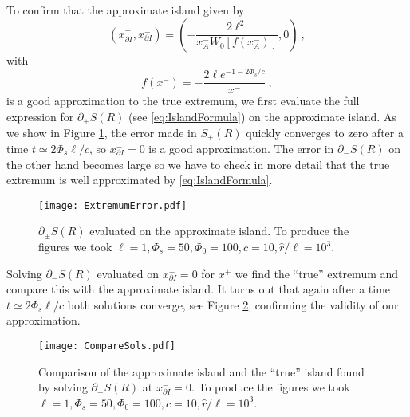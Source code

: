 \documentclass[a4paper,11pt]{article}
\newcommand{\beq}{\begin{equation}}
\newcommand{\eeq}{\end{equation}}
\numberwithin{equation}{section}
\begin{document}
To confirm that the approximate island given by
\beq
(x_{\partial I}^+,x_{\partial I}^-) = \left(-\frac{2\ell^2}{x_A^-W_0\left[f(x_A^-)\right]},0\right) ~,
\eeq
with
\beq
f(x^-)=-\frac{2\ell e^{-1-2\Phi_s/c}}{x^-} ~,
\eeq
is a good approximation to the true extremum, we first evaluate the full expression for $\partial_\pm S(R)$ (see \eqref{eq:IslandFormula}) on the approximate island. As we show in Figure \ref{fig:ExtremumError}, the error made in $S_+(R)$ quickly converges to zero after a time $t\simeq 2\Phi_s\ell/c$, so $x_{\partial I}^-=0$ is a good approximation. The error in $\partial_{-}S(R)$ on the other hand becomes large so we have to check in more detail that the true extremum is well approximated by \eqref{eq:IslandFormula}.
%
\begin{figure}[h!]
\centering
\texttt{[image: ExtremumError.pdf]}
\caption{$\partial_\pm S(R)$ evaluated on the approximate island. To produce the figures we took $\ell=1, \Phi_s=50, \Phi_0=100, c=10, \hat r/\ell = 10^3$.}
\label{fig:ExtremumError}
\end{figure}
%
Solving $\partial_-S(R)$ evaluated on $x_{\partial I}^-=0$ for $x^+$ we find the ``true'' extremum and compare this with the approximate island. It turns out that again after a time $t\simeq 2\Phi_s\ell/c$ both solutions converge, see Figure \ref{fig:CompareSols}, confirming the validity of our approximation.
%
\begin{figure}[h!]
\centering
\texttt{[image: CompareSols.pdf]}
\caption{Comparison of the approximate island and the ``true'' island found by solving $\partial_-S(R)$ at $x_{\partial I}^-=0$. To produce the figures we took $\ell=1, \Phi_s=50, \Phi_0=100, c=10, \hat r/\ell = 10^3$.}
\label{fig:CompareSols}
\end{figure}
%



\end{document}
